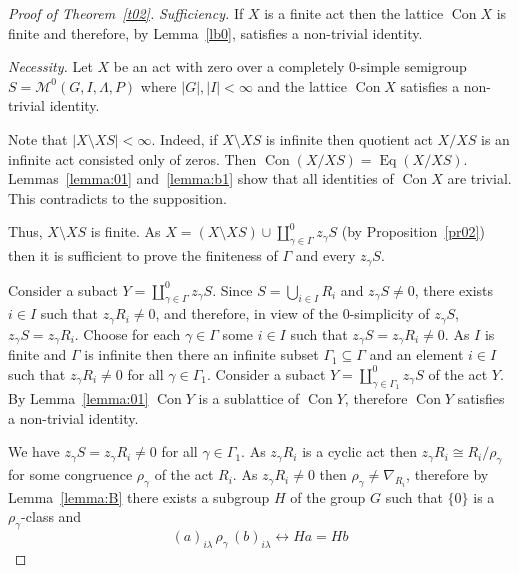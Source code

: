\documentclass{birkau}
\numberwithin{equation}{section}
\theoremstyle{plain}
\theoremstyle{definition}
\DeclareMathOperator{\Con}{Con}
\DeclareMathOperator{\Eq}{Eq}
\begin{document}
	\begin{proof}[Proof of Theorem~\ref{t02}]
		\textit{Sufficiency.} If $X$ is a finite act then the lattice  $\Con X$ is finite and therefore, by Lemma~\ref{lb0}, satisfies a non-trivial identity.
		
		\textit{Necessity.} Let $X$ be an act with zero over a completely 0-simple semigroup $S={\mathcal M}^0(G,I,\Lambda,P)$ where $|G|,|I| <\infty$ and the lattice $\Con X$ satisfies a non-trivial identity.

        Note that $|X\setminus XS|<\infty$. Indeed, if $X\setminus XS$ is infinite then quotient act $X/XS$ is an infinite act consisted only of zeros. Then $\Con (X/XS) = \Eq (X/XS)$. Lemmas~\ref{lemma:01} and~\ref{lemma:b1} show that all identities of $\Con X$ are trivial. This contradicts to the supposition.

        Thus, $X\setminus XS$ is finite. As $X=(X\setminus XS)\cup \coprod_{\gamma \in \Gamma}^0 z_\gamma S$ (by Proposition~\ref{pr02}) then it is sufficient to prove the finiteness of $\Gamma$ and every $z_\gamma S$.

        Consider a subact $Y=\coprod_{\gamma \in \Gamma}^0 z_\gamma S$. Since $S=\bigcup_{i \in I}R_i$ and $z_\gamma S \ne 0$, there exists $i \in I$ such that $z_\gamma R_i \ne 0$, and therefore, in view of the 0-simplicity of $z_\gamma S$, $z_\gamma S = z_\gamma R_i$. Choose for each $\gamma \in \Gamma$ some $i \in I$ such that $z_\gamma S = z_\gamma R_i \ne 0$. As $I$ is finite and $\Gamma$ is infinite then there an infinite subset $\Gamma_1 \subseteq \Gamma$ and an element $i \in I$ such that $z_\gamma R_i \ne 0$ for all $\gamma \in \Gamma_1$. Consider a subact $Y =\coprod_{\gamma \in \Gamma_1}^0 z_\gamma S$ of the act $Y$. By Lemma~\ref{lemma:01} $\Con Y$ is a sublattice of $\Con Y$, therefore $\Con Y$ satisfies a non-trivial identity.

        We have $z_\gamma S = z_\gamma R_i \ne 0$ for all $\gamma \in \Gamma_1$. As $z_\gamma R_i$ is a cyclic act then $z_\gamma R_i \cong R_i/\rho_\gamma$ for some congruence $\rho_\gamma$ of the act $R_i$. As $z_\gamma R_i \ne 0$ then $\rho_\gamma \ne \nabla_{R_i}$, therefore by Lemma~\ref{lemma:B} there exists a subgroup $H$ of the group $G$ such that $\{ 0 \}$ is a $\rho_\gamma$-class and
        $$ (a)_{i\lambda}\, \rho_\gamma \, (b)_{i\lambda} \leftrightarrow Ha=Hb  $$


\end{proof}
\end{document}
